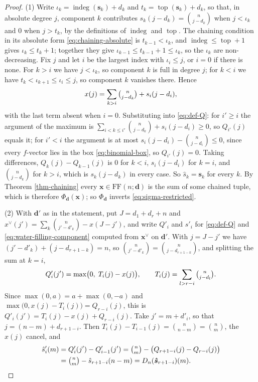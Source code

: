 \documentclass[11pt, a4paper, abstract=yes]{scrartcl}
\theoremstyle{definition}
\theoremstyle{remark}
\theoremstyle{plain}
\newcommand{\vek}[1]{\boldsymbol{#1}}
\newcommand{\indeg}{\operatorname{indeg}}
\newcommand{\tp}{\operatorname{top}}
\begin{document}
\begin{proof}
(1) Write \(\iota_k=\indeg(\vek s_k)+d_k\) and \(t_k=\tp(\vek s_k)+d_k\), so that, in absolute degree
\(j\), component \(k\) contributes \(s_k(j-d_k)=\binom n{j-d_k}\) when \(j<\iota_k\) and \(0\) when
\(j>t_k\), by the definitions of \(\indeg\) and \(\tp\). The chaining condition in its absolute form
\eqref{eq:chaining-absolute} is \(t_{k-1}<\iota_k\), and \(\indeg\le\tp+1\) gives
\(\iota_k\le t_k+1\); together they give \(\iota_{k-1}\le t_{k-1}+1\le\iota_k\), so the \(\iota_k\) are
non-decreasing. Fix \(j\) and let \(i\) be the largest index with \(\iota_i\le j\), or \(i=0\) if there is
none. For \(k>i\) we have \(j<\iota_k\), so component \(k\) is full in degree \(j\); for \(k<i\) we have
\(t_k<\iota_{k+1}\le\iota_i\le j\), so component \(k\) vanishes there. Hence
\[
  x(j)=\sum_{k>i}\tbinom n{j-d_k}+s_i(j-d_i),
\]
with the last term absent when \(i=0\). Substituting into \eqref{eq:def-Q}: for \(i'\ge i\) the
argument of the maximum is \(\sum_{i<k\le i'}\binom n{j-d_k}+s_i(j-d_i)\ge0\), so \(Q_{i'}(j)\) equals
it; for \(i'<i\) the argument is at most \(s_i(j-d_i)-\binom n{j-d_i}\le0\), since every
\(f\)-vector lies in the box \eqref{eq:binomial-box}, so \(Q_{i'}(j)=0\). Taking differences,
\(Q_k(j)-Q_{k-1}(j)\) is \(0\) for \(k<i\), \(s_i(j-d_i)\) for \(k=i\), and \(\binom n{j-d_k}\) for
\(k>i\), which is \(s_k(j-d_k)\) in every case. So \(\hat s_k=\vek s_k\) for every \(k\). By
Theorem \ref{thm-chaining} every \(\vek x\in\mathrm{FF}(n;\vek d)\) is the sum of some chained tuple,
which is therefore \(\Phi_{\vek d}(\vek x)\); so \(\Phi_{\vek d}\) inverts \eqref{eq:sigma-restricted}.

(2) With \(\vek d'\) as in the statement, put \(J=d_1+d_r+n\) and
\(x^{\vee}(j')=\sum_k\binom n{j'-d'_k}-x(J-j')\), and write \(Q'_i\) and \(\hat s'_i\) for
\eqref{eq:def-Q} and \eqref{eq:water-filling-component} computed from \(\vek x^{\vee}\) on
\(\vek d'\). With \(j=J-j'\) we have
\((j'-d'_k)+(j-d_{r+1-k})=n\), so \(\binom n{j'-d'_k}=\binom n{j-d_{r+1-k}}\), and splitting the sum
at \(k=i\),
\[
  Q'_i(j')=\max\bigl(0,\;T_i(j)-x(j)\bigr),\qquad T_i(j)=\sum_{l>r-i}\tbinom n{j-d_l}.
\]
Since \(\max(0,a)=a+\max(0,-a)\) and \(\max\bigl(0,x(j)-T_i(j)\bigr)=Q_{r-i}(j)\), this is
\(Q'_i(j')=T_i(j)-x(j)+Q_{r-i}(j)\). Take \(j'=m+d'_i\), so that \(j=(n-m)+d_{r+1-i}\). Then
\(T_i(j)-T_{i-1}(j)=\binom n{n-m}=\binom nm\), the \(x(j)\) cancel, and
\begin{align*}
  \hat s'_i(m)&=Q'_i(j')-Q'_{i-1}(j')=\tbinom nm-\bigl(Q_{r+1-i}(j)-Q_{r-i}(j)\bigr)\\
  &=\tbinom nm-\hat s_{r+1-i}(n-m)=D_n(\vek{\hat s}_{r+1-i})(m).
\end{align*}
\end{proof}
\end{document}
